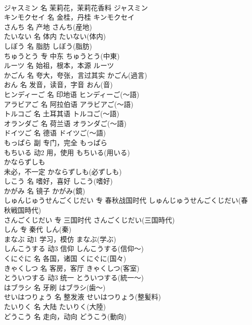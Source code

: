\documentclass[8pt]{extreport}
\begin{document}
\begin{CJK}{UTF8}{min}
\\	ジャスミン	名	茉莉花，茉莉花香料	ジャスミン	
\\	キンモクセイ	名	金桂，丹桂	キンモクセイ	
\\	さんち	名	产地	さんち(産地)	
\\	たいない	名	体内	たいない(体内)	
\\	しぼう	名	脂肪	しぼう(脂肪)	
\\	ちゅうとう	专	中东	ちゅうとう(中東)	
\\	ルーツ	名	始祖，根本，本源	ルーツ	
\\	かごん	名	夸大，夸张，言过其实	かごん(過言)	
\\	おん	名	发音，读音，字音	おん(音)	
\\	ヒンディーご	名	印地语	ヒンディーご(～語)	
\\	アラビアご	名	阿拉伯语	アラビアご(～語)	
\\	トルコご	名	土耳其语	トルコご(～語)	
\\	オランダご	名	荷兰语	オランダご(～語)	
\\	ドイツご	名	德语	ドイツご(～語)	
\\	もっぱら	副	专门，完全	もっぱら	
\\	もちいる	动2	用，使用	もちいる(用いる)	
\\	かならずしも	
\\	未必，不一定	かならずしも(必ずしも)	
\\	しこう	名	嗜好，喜好	しこう(嗜好)	
\\	かがみ	名	镜子	かがみ(鏡)	
\\	しゅんじゅうせんごくじだい	专	春秋战国时代	しゅんじゅうせんごくじだい(春秋戦国時代)	
\\	さんごくじだい	专	三国时代	さんごくじだい(三国時代)	
\\	しん	专	秦代	しん(秦)	
\\	まなぶ	动1	学习，模仿	まなぶ(学ぶ)	
\\	しんこうする	动3	信仰	しんこうする(信仰～)	
\\	くにぐに	名	各国，诸国	くにぐに(国々)	
\\	きゃくしつ	名	客房，客厅	きゃくしつ(客室)	
\\	とういつする	动3	统一	とういつする(統一～)	
\\	はブラシ	名	牙刷	はブラシ(歯～)	
\\	せいはつりょう	名	整发液	せいはつりょう(整髪料)	
\\	たいりく	名	大陆	たいりく(大陸)	
\\	どうこう	名	走向，动向	どうこう(動向)	

\end{CJK}
\end{document}
